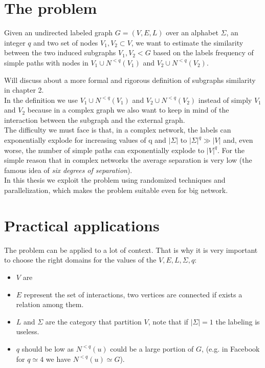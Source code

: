 \section{The problem}

\begin{problema}
Given an undirected labeled graph $G=(V,E,L)$ over an alphabet $\Sigma$, an integer $q$
and two set of nodes $V_{1}, V_{2} \subset V$, we want to estimate the similarity between the two induced subgraphs $V_{1}, V_{2} < G$ based on the labels frequency of simple paths with nodes in $V_{1} \cup N^{<q}(V_{1})$ and $V_{2} \cup N^{<q}(V_{2})$.

\end{problema}

Will discuss about a more formal and rigorous definition of subgraphs similarity in chapter 2.\\

In the definition we use $V_{1} \cup N^{<q}(V_{1})$ and $V_{2} \cup N^{<q}(V_{2})$ instead of simply $V_{1}$ and $V_{2}$ because in a complex graph we also want to keep in mind of the interaction between the subgraph and the external graph.\\

The difficulty we must face is that, in a complex network, the labels can exponentially explode for increasing values of q and $|\Sigma|$ to $|\Sigma|^{q} \gg |V|$ and, even worse, the number of simple paths can exponentially explode to $|V|^{q}$. 
For the simple reason that in complex networks the average separation is very low (the famous idea of \textit{six degrees of separation}).\\

In this thesis we exploit the problem using randomized techniques and parallelization, which makes the problem suitable even for big network. 

\section{Practical applications}

The problem can be applied to a lot of context.
That is why it is very important to choose the right domains for the values of the $V, E, L, \Sigma, q$:
\begin{itemize}
\item $V$ are 
\item $E$ represent the set of interactions, two vertices are connected if exists a relation among them.
\item $L$ and $\Sigma$ are the category that partition $V$, note that if $|\Sigma| = 1$ the labeling is useless.
\item $q$ should be low as $N^{<q}(u)$ could be a large portion of $G$, (e.g. in Facebook for $q \simeq 4$ we have $N^{<q}(u) \simeq G$).
\end{itemize}

